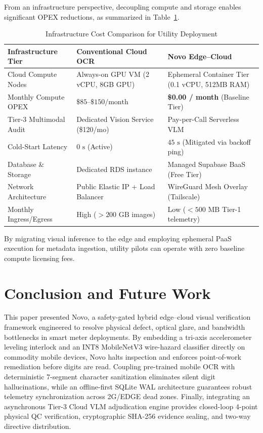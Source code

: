 \documentclass[conference]{IEEEtran}
\begin{document}
From an infrastructure perspective, decoupling compute and storage enables significant OPEX reductions, as summarized in Table~\ref{tab:cost_comparison}.

\begin{table}[t]
\caption{Infrastructure Cost Comparison for Utility Deployment}
\label{tab:cost_comparison}
\centering
\small
\begin{tabularx}{\columnwidth}{lXX}
\toprule
\textbf{Infrastructure Tier} & \textbf{Conventional Cloud OCR} & \textbf{Novo Edge--Cloud} \\
\midrule
Cloud Compute Nodes & Always-on GPU VM (2 vCPU, 8GB GPU) & Ephemeral Container Tier (0.1 vCPU, 512MB RAM) \\
Monthly Compute OPEX & $\$85\text{--}\$150/\text{month}$ & \textbf{\$0.00 / month} (Baseline Tier) \\
Tier-3 Multimodal Audit & Dedicated Vision Service (\$120/mo) & Pay-per-Call Serverless VLM \\
Cold-Start Latency & $0\text{~s}$ (Active) & $45\text{~s}$ (Mitigated via backoff ping) \\
Database \& Storage & Dedicated RDS instance & Managed Supabase BaaS (Free Tier) \\
Network Architecture & Public Elastic IP + Load Balancer & WireGuard Mesh Overlay (Tailscale) \\
Monthly Ingress/Egress & High ($>200\text{~GB}$ images) & Low ($<500\text{~MB}$ Tier-1 telemetry) \\
\bottomrule
\end{tabularx}
\end{table}

By migrating visual inference to the edge and employing ephemeral PaaS execution for metadata ingestion, utility pilots can operate with zero baseline compute licensing fees.

\section{Conclusion and Future Work}
This paper presented Novo, a safety-gated hybrid edge--cloud visual verification framework engineered to resolve physical defect, optical glare, and bandwidth bottlenecks in smart meter deployments. By embedding a tri-axis accelerometer leveling interlock and an INT8 MobileNetV3 wire-hazard classifier directly on commodity mobile devices, Novo halts inspection and enforces point-of-work remediation before digits are read. Coupling pre-trained mobile OCR with deterministic 7-segment character sanitization eliminates silent digit hallucinations, while an offline-first SQLite WAL architecture guarantees robust telemetry synchronization across 2G/EDGE dead zones. Finally, integrating an asynchronous Tier-3 Cloud VLM adjudication engine provides closed-loop 4-point physical QC verification, cryptographic SHA-256 evidence sealing, and two-way directive distribution.
\end{document}
